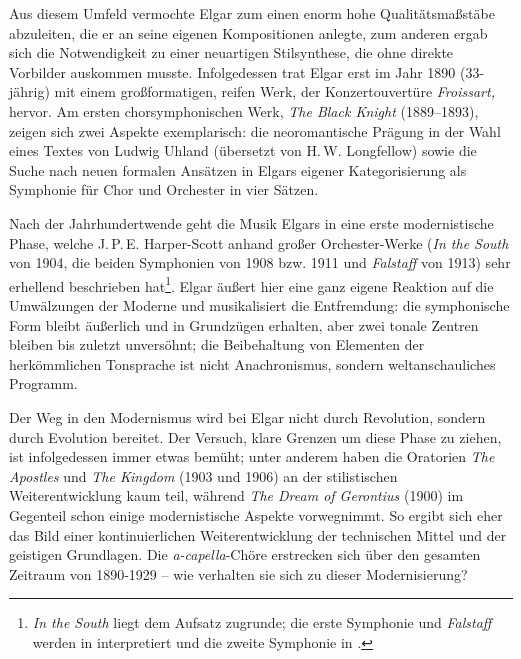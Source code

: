 \documentclass[a4paper,11pt,open=any]{scrbook}
\begin{document}
Aus diesem Umfeld vermochte Elgar zum einen enorm hohe Qualitätsmaßstäbe
abzuleiten, die er an seine eigenen Kompositionen anlegte, zum anderen ergab
sich die Notwendigkeit zu einer neuartigen Stilsynthese, die ohne direkte
Vorbilder auskommen musste.  Infolgedessen trat Elgar erst im Jahr 1890
(33-jährig) mit einem großformatigen, reifen Werk, der Konzertouvertüre
\textit{Frois\-sart,} hervor.  Am ersten chorsymphonischen Werk, \textit{The
Black Knight} (1889–1893), zeigen sich zwei Aspekte exemplarisch: die neoromantische
Prägung in der Wahl eines Textes von Ludwig Uhland (übersetzt von H.\,W.
Longfellow) sowie die Suche nach neuen formalen Ansätzen in Elgars eigener
Kategorisierung als Symphonie für Chor und Orchester in vier Sätzen.

Nach der Jahrhundertwende geht die Musik Elgars in eine erste modernistische Phase,
welche J.\,P.\,E. Harper-Scott anhand großer Orchester-Werke (\textit{In the
South} von 1904, die beiden Symphonien von 1908 bzw. 1911 und \textit{Falstaff}
von 1913) sehr erhellend beschrieben hat\footnote{\textit{In the South} liegt dem Aufsatz
\cite{harperscott2013} zugrunde; die erste Symphonie und \textit{Falstaff}
werden in \cite{harperscott2006} interpretiert und die zweite Symphonie in
\cite{harperscott2007}.}.  Elgar äußert hier eine ganz eigene Reaktion auf die
Umwälzungen der Moderne und musikalisiert die Entfremdung: die symphonische Form
bleibt äußerlich und in Grundzügen erhalten, aber zwei tonale Zentren bleiben bis
zuletzt unversöhnt; die Beibehaltung von Elementen der herkömmlichen Tonsprache ist
nicht Anachronismus, sondern weltanschauliches Programm.

Der Weg in den Modernismus wird bei Elgar nicht durch Revolution, sondern
durch Evolution bereitet.  Der Versuch, klare Grenzen um diese Phase zu
ziehen, ist infolgedessen immer etwas bemüht; unter anderem haben die
Oratorien \textit{The Apostles} und \textit{The Kingdom} (1903 und 1906)
an der stilistischen Weiterentwicklung kaum teil, während \textit{The Dream
of Gerontius} (1900) im Gegenteil schon einige modernistische Aspekte
vorwegnimmt\cite[S.~14f.]{harperscott2006}.  So ergibt sich eher das Bild
einer kontinuierlichen Weiterentwicklung der technischen Mittel und der
geistigen Grundlagen.  Die \textit{a-capella}-Chöre erstrecken sich
über den gesamten Zeitraum von 1890-1929 – wie verhalten sie sich zu dieser
Modernisierung?
\end{document}

